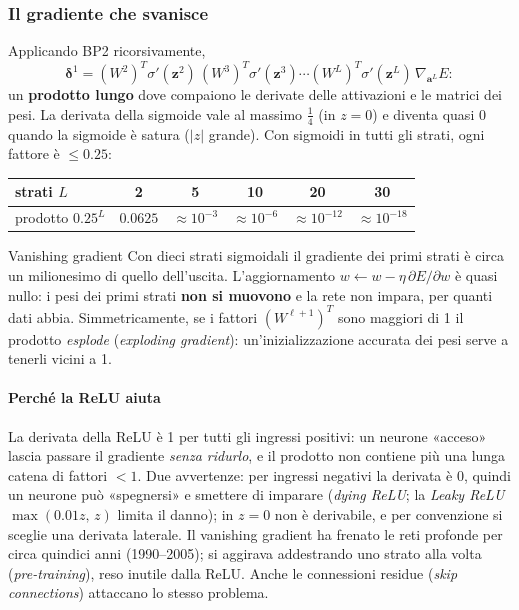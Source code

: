 \documentclass[12pt]{extarticle}
\begin{document}
\subsubsection{Il gradiente che svanisce}

\noindent Applicando BP2 ricorsivamente,
\[
\boldsymbol{\delta}^1=(W^2)^T\sigma'(\mathbf{z}^2)\,(W^3)^T\sigma'(\mathbf{z}^3)\cdots(W^L)^T\sigma'(\mathbf{z}^L)\,\nabla_{\mathbf{a}^L}E:
\]
un \textbf{prodotto lungo} dove compaiono le derivate delle attivazioni e le matrici dei pesi. La derivata della sigmoide vale al massimo $\tfrac14$ (in $z=0$) e diventa quasi 0 quando la sigmoide è satura ($|z|$ grande). Con sigmoidi in tutti gli strati, ogni fattore è $\le0.25$:

\begin{center}
\small
\begin{tabular}{lccccc}
    \toprule
    strati $L$ & 2 & 5 & 10 & 20 & 30 \\
    \midrule
    prodotto $0.25^L$ & $0.0625$ & $\approx10^{-3}$ & $\approx10^{-6}$ & $\approx10^{-12}$ & $\approx10^{-18}$ \\
    \bottomrule
\end{tabular}
\end{center}

\begin{attenzionebox}{Vanishing gradient}
Con dieci strati sigmoidali il gradiente dei primi strati è circa un milionesimo di quello dell'uscita. L'aggiornamento $w\leftarrow w-\eta\,\partial E/\partial w$ è quasi nullo: i pesi dei primi strati \textbf{non si muovono} e la rete non impara, per quanti dati abbia. Simmetricamente, se i fattori $(W^{\ell+1})^T$ sono maggiori di 1 il prodotto \emph{esplode} (\emph{exploding gradient}): un'inizializzazione accurata dei pesi serve a tenerli vicini a 1.
\end{attenzionebox}

\paragraph{Perché la ReLU aiuta}
La derivata della ReLU è 1 per tutti gli ingressi positivi: un neurone «acceso» lascia passare il gradiente \emph{senza ridurlo}, e il prodotto non contiene più una lunga catena di fattori $<1$. Due avvertenze: per ingressi negativi la derivata è 0, quindi un neurone può «spegnersi» e smettere di imparare (\emph{dying ReLU}; la \emph{Leaky ReLU} $\max(0.01z,\,z)$ limita il danno); in $z=0$ non è derivabile, e per convenzione si sceglie una derivata laterale. Il vanishing gradient ha frenato le reti profonde per circa quindici anni (1990--2005); si aggirava addestrando uno strato alla volta (\emph{pre-training}), reso inutile dalla ReLU. Anche le connessioni residue (\emph{skip connections}) attaccano lo stesso problema.
\end{document}
